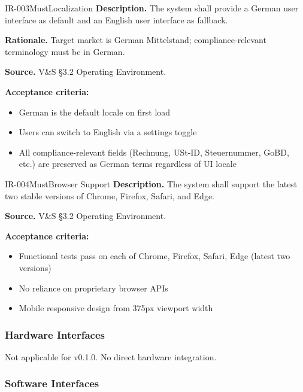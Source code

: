 \documentclass[11pt,a4paper]{article}
\begin{document}
\begin{requirement}{IR-003}{Must}{Localization}
\textbf{Description.} The system shall provide a German user interface as default and an English user interface as fallback.

\textbf{Rationale.} Target market is German Mittelstand; compliance-relevant terminology must be in German.

\textbf{Source.} V\&S \S3.2 Operating Environment.

\textbf{Acceptance criteria:}
\begin{itemize}
    \item German is the default locale on first load
    \item Users can switch to English via a settings toggle
    \item All compliance-relevant fields (Rechnung, USt-ID, Steuernummer, GoBD, etc.) are preserved as German terms regardless of UI locale
\end{itemize}
\end{requirement}

\begin{requirement}{IR-004}{Must}{Browser Support}
\textbf{Description.} The system shall support the latest two stable versions of Chrome, Firefox, Safari, and Edge.

\textbf{Source.} V\&S \S3.2 Operating Environment.

\textbf{Acceptance criteria:}
\begin{itemize}
    \item Functional tests pass on each of Chrome, Firefox, Safari, Edge (latest two versions)
    \item No reliance on proprietary browser APIs
    \item Mobile responsive design from 375px viewport width
\end{itemize}
\end{requirement}

\subsubsection{Hardware Interfaces}

Not applicable for v0.1.0. No direct hardware integration.

\subsubsection{Software Interfaces}
\end{document}
